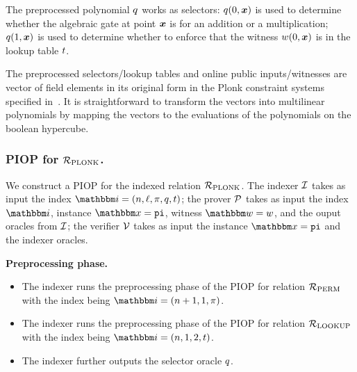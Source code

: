 \begin{remark}
    The preprocessed polynomial $q$ works as selectors: $q(0, \boldsymbol{x})$ is used 
    to determine whether the algebraic gate at point $\boldsymbol{x}$ is for an addition or a multiplication;
    $q(1, \boldsymbol{x})$ is used to determine whether to enforce that the witness $w(0, \boldsymbol{x})$ is in
    the lookup table $t$.
\end{remark}

\begin{remark}[Arithmetization]
    The preprocessed selectors/lookup tables and online public inputs/witnesses are vector
    of field elements in its original form in the Plonk constraint systems specified in~\cite{GWC19}.
    It is straightforward to transform the vectors into multilinear polynomials by mapping the 
    vectors to the evaluations of the polynomials on the boolean hypercube. 
\end{remark}

\subsubsection*{PIOP for ${\mathcal{R}}_{\text{PLONK}}$.}
We construct a PIOP for the indexed relation ${\mathcal{R}}_{\text{PLONK}}$.
The indexer $\mathcal{I}$ takes as input the index $\idxR = (n, \ell, \perm, \sel, \tabp)$;
the prover $\mathcal{P}$ takes as input the index $\idxR$, instance $\instR = \pubinp$,
witness $\witR = \witp$, and the ouput oracles from $\mathcal{I}$;
the verifier $\mathcal{V}$ takes as input the instance $\instR = \pubinp$ and 
the indexer oracles.


\textbf{Preprocessing phase.}
\begin{itemize}
    \item The indexer runs the preprocessing phase of the PIOP for relation ${\mathcal{R}}_{\text{PERM}}$ with 
        the index being $\idxR = (n+1, 1, \perm)$.
    \item The indexer runs the preprocessing phase of the PIOP for relation ${\mathcal{R}}_{\text{LOOKUP}}$ with
        the index being $\idxR = (n, 1, 2, \tabp)$.
    \item The indexer further outputs the selector oracle $q$.
\end{itemize}


